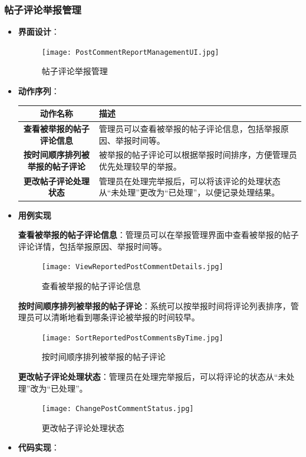 \subsubsection{帖子评论举报管理}

\begin{itemize}
	\item \textbf{界面设计}：
	\begin{figure}[H]
		\centering
		\texttt{[image: PostCommentReportManagementUI.jpg]}
		\caption{帖子评论举报管理}
	\end{figure}
	\item \textbf{动作序列}：
	\begin{table}[H]
		\centering
		\renewcommand\arraystretch{1.5}
		\begin{tabular}{|c|>{\raggedright\arraybackslash}p{10cm}|}
			\hline
			\textbf{动作名称} & \textbf{描述} \\ \hline
			\textbf{查看被举报的帖子评论信息} & 管理员可以查看被举报的帖子评论信息，包括举报原因、举报时间等。\\ \hline
			\textbf{按时间顺序排列被举报的帖子评论} & 被举报的帖子评论可以根据举报时间排序，方便管理员优先处理较早的举报。\\ \hline
			\textbf{更改帖子评论处理状态} & 管理员在处理完举报后，可以将该评论的处理状态从“未处理”更改为“已处理”，以便记录处理结果。\\ \hline
		\end{tabular}
	\end{table}
	
	\item \textbf{用例实现}
	
	\textbf{查看被举报的帖子评论信息}：管理员可以在举报管理界面中查看被举报的帖子评论详情，包括举报原因、举报时间等。
	
	\begin{figure}[H]
		\centering
		\texttt{[image: ViewReportedPostCommentDetails.jpg]}
		\caption{查看被举报的帖子评论信息}
	\end{figure}
	
	\textbf{按时间顺序排列被举报的帖子评论}：系统可以按举报时间将评论列表排序，管理员可以清晰地看到哪条评论被举报的时间较早。
	
	\begin{figure}[H]
		\centering
		\texttt{[image: SortReportedPostCommentsByTime.jpg]}
		\caption{按时间顺序排列被举报的帖子评论}
	\end{figure}
	
	\textbf{更改帖子评论处理状态}：管理员在处理完举报后，可以将评论的状态从“未处理”改为“已处理”。
	
	\begin{figure}[H]
		\centering
		\texttt{[image: ChangePostCommentStatus.jpg]}
		\caption{更改帖子评论处理状态}
	\end{figure}
	
	\item \textbf{代码实现}：
	
\end{itemize}

